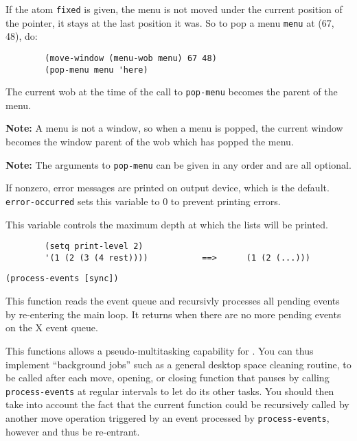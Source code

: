 If the atom \verb"fixed" is given, the menu is not moved under the current
position of the pointer, it stays at the last position it was. So to pop a
menu \verb"menu" at (67, 48), do:

{\exemplefont\begin{verbatim}
        (move-window (menu-wob menu) 67 48)
        (pop-menu menu 'here)
\end{verbatim}}

The current wob at the time of the call to \verb"pop-menu" becomes the
parent of the menu.

{\bf Note:} A menu is not a {\GWM} window, so when a menu is popped, 
the current
window becomes the window parent of the wob which has popped the menu.

{\bf Note:} The arguments to \verb"pop-menu" can be given in any order and
are all optional.



If nonzero, {\WOOL} error messages are printed on {\GWM} output device,
which is the default. \verb"error-occurred" sets this variable to 0 to
prevent printing errors.



This variable controls the maximum depth at which the lists will be printed.

{\exemplefont\begin{verbatim}
        (setq print-level 2)
        '(1 (2 (3 (4 rest))))           ==>      (1 (2 (...)))
\end{verbatim}}



{\usagefont\begin{verbatim}
(process-events [sync])
\end{verbatim}}\usageupspace

This function reads the event queue and recursivly processes all pending
events by re-entering the main {\GWM} loop. It returns when there are no
more pending events on the X event queue.

This functions allows a pseudo-multitasking capability for {\GWM}.
You can thus implement ``background jobs'' such as a general desktop space
cleaning routine, to be called after each move, opening, or closing function
that pauses by calling \verb"process-events" at regular intervals to let
{\GWM} do its other tasks. You should then take into account the fact that
the current function could be recursively called by another move operation
triggered by an event processed by \verb"process-events", however and thus
be re-entrant.

